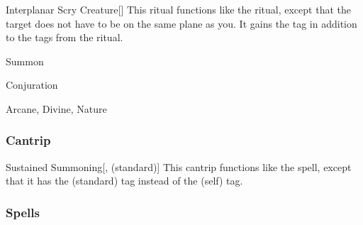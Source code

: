 \lowercase{\hypertarget{spell:Interplanar Scry Creature}{}}\label{spell:Interplanar Scry Creature}
\begin{apability}[\nth{7}]{\hypertarget{spell:Interplanar Scry Creature}{Interplanar Scry Creature}}[]
This ritual functions like the  ritual, except that the target does not have to be on the same plane as you.
It gains the  tag in addition to the tags from the  ritual.
\end{apability}
\vspace{0.25em}


\newpage
\begin{spellsection}{Summon}

\begin{spellheader}
\end{spellheader}


 Conjuration

 Arcane, Divine, Nature

\subsubsection{Cantrip}


\begin{freeability}{Sustained Summoning}[,  (standard)]
This cantrip functions like the  spell, except that it has the  (standard) tag instead of the  (self) tag.
\end{freeability}

\end{spellsection}


\subsubsection{Spells}


